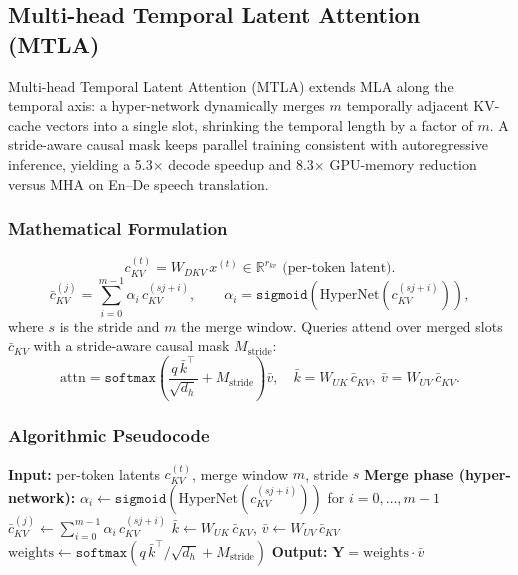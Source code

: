 \subsection{Multi-head Temporal Latent Attention (MTLA)}
Multi-head Temporal Latent Attention (MTLA) \citep{deng_mtla_2025} extends MLA along the temporal axis: a hyper-network dynamically merges $m$ temporally adjacent KV-cache vectors into a single slot, shrinking the temporal length by a factor of $m$. A stride-aware causal mask keeps parallel training consistent with autoregressive inference, yielding a 5.3$\times$ decode speedup and 8.3$\times$ GPU-memory reduction versus MHA on En--De speech translation.

\subsubsection{Mathematical Formulation}
\[
c_{KV}^{(t)} = W_{DKV}\, x^{(t)} \in \mathbb{R}^{r_{kv}} \text{ (per-token latent)}.
\]
\[
\bar c_{KV}^{(j)} = \sum_{i=0}^{m-1} \alpha_i\, c_{KV}^{(s j + i)}, \qquad \alpha_i = \texttt{sigmoid}(\text{HyperNet}(c_{KV}^{(s j + i)})),
\]
where $s$ is the stride and $m$ the merge window. Queries attend over merged slots $\bar c_{KV}$ with a stride-aware causal mask $M_{\text{stride}}$:
\[
\text{attn} = \texttt{softmax}\!\left(\frac{q\, \bar k^\top}{\sqrt{d_h}} + M_{\text{stride}}\right) \bar v, \quad \bar k = W_{UK}\, \bar c_{KV},\ \bar v = W_{UV}\, \bar c_{KV}.
\]

\subsubsection{Algorithmic Pseudocode}
\begin{algorithmic}[1]
\State \textbf{Input:} per-token latents $c_{KV}^{(t)}$, merge window $m$, stride $s$
\State \textbf{Merge phase (hyper-network):}
    \State $\alpha_i \gets \texttt{sigmoid}(\text{HyperNet}(c_{KV}^{(s j + i)}))$ for $i = 0, \ldots, m-1$
    \State $\bar c_{KV}^{(j)} \gets \sum_{i=0}^{m-1} \alpha_i\, c_{KV}^{(s j + i)}$ 
\EndFor
\State $\bar k \gets W_{UK}\, \bar c_{KV}$, \quad $\bar v \gets W_{UV}\, \bar c_{KV}$
\State $\text{weights} \gets \texttt{softmax}(q\, \bar k^\top / \sqrt{d_h} + M_{\text{stride}})$ 
\State \textbf{Output:} $\mathbf{Y} = \text{weights} \cdot \bar v$
\end{algorithmic}

